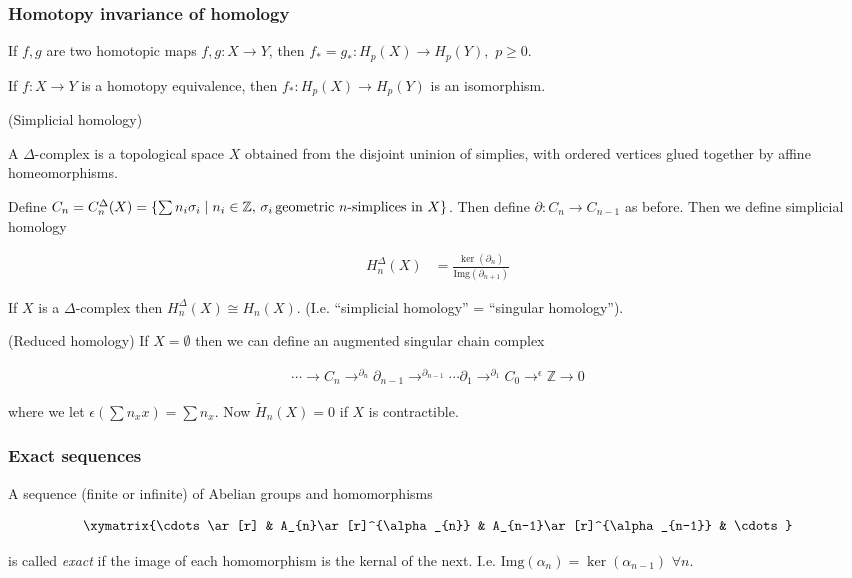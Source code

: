 \subsubsection{Homotopy invariance of homology}
\begin{thm}
If $f,g$ are two homotopic maps $f,g:X\to Y$, then $f_{*}=g_{*}:H_{p}(X)\to H_{p}(Y),$
$p\geqslant0$.\end{thm}
\begin{cor}
If $f:X\to Y$ is a homotopy equivalence, then $f_{*}:H_{p}(X)\to H_{p}(Y)$
is an isomorphism.\end{cor}
\begin{defn}
(Simplicial homology)

A $\Delta$-complex is a topological space $X$ obtained from the
disjoint uninion of simplies, with ordered vertices glued together
by affine homeomorphisms.
\end{defn}
Define $C_{n}=C_{n}^{\Delta}(X)=\left\{ \sum n_{i}\sigma_{i}\mid n_{i}\in\mathbb{Z},\,\sigma_{i}\,\text{geometric \ensuremath{n}-simplices in \ensuremath{X}}\right\} $.
Then define $\partial:C_{n}\to C_{n-1}$ as before. Then we define
simplicial homology

\begin{align*}
H_{n}^{\Delta}(X) & =\frac{\ker(\partial_{n})}{\text{Img}(\partial_{n+1})}
\end{align*}

\begin{thm}
If $X$ is a $\Delta$-complex then $H_{n}^{\Delta}(X)\cong H_{n}(X)$.
(I.e. ``simplicial homology'' = ``singular homology'').\end{thm}
\begin{defn}
(Reduced homology) If $X=\emptyset$ then we can define an augmented
singular chain complex

\begin{align*}
\cdots\to C_{n}\to^{\partial_{n}}\partial_{n-1}\to^{\partial_{n-1}}\cdots\partial_{1}\to^{\partial_{1}}C_{0}\to^{\epsilon}\mathbb{Z}\to0
\end{align*}


where we let $\epsilon\left(\sum n_{x}x\right)=\sum n_{x}$. Now $\tilde{H}_{n}(X)=0$
if $X$ is contractible.
\end{defn}

\subsubsection{Exact sequences}
\begin{defn}
A sequence (finite or infinite) of Abelian groups and homomorphisms

\begin{align*}
\xymatrix{\cdots\ar[r] & A_{n}\ar[r]^{\alpha_{n}} & A_{n-1}\ar[r]^{\alpha_{n-1}} & \cdots}
\end{align*}


is called \emph{exact} if the image of each homomorphism is the kernal
of the next. I.e. $\text{Img}(\alpha_{n})=\ker(\alpha_{n-1})$ $\forall n$.
\end{defn}

